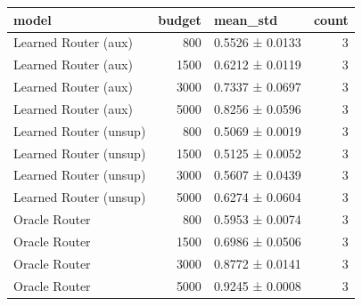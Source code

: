 \begin{tabular}{lrlr}
\toprule
model & budget & mean\_std & count \\
\midrule
Learned Router (aux) & 800 & 0.5526 ± 0.0133 & 3 \\
Learned Router (aux) & 1500 & 0.6212 ± 0.0119 & 3 \\
Learned Router (aux) & 3000 & 0.7337 ± 0.0697 & 3 \\
Learned Router (aux) & 5000 & 0.8256 ± 0.0596 & 3 \\
Learned Router (unsup) & 800 & 0.5069 ± 0.0019 & 3 \\
Learned Router (unsup) & 1500 & 0.5125 ± 0.0052 & 3 \\
Learned Router (unsup) & 3000 & 0.5607 ± 0.0439 & 3 \\
Learned Router (unsup) & 5000 & 0.6274 ± 0.0604 & 3 \\
Oracle Router & 800 & 0.5953 ± 0.0074 & 3 \\
Oracle Router & 1500 & 0.6986 ± 0.0506 & 3 \\
Oracle Router & 3000 & 0.8772 ± 0.0141 & 3 \\
Oracle Router & 5000 & 0.9245 ± 0.0008 & 3 \\
\bottomrule
\end{tabular}
